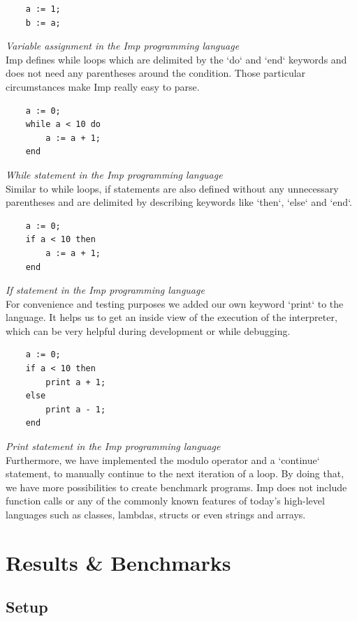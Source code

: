 \documentclass{article}
\begin{document}
\begin{verbatim}
    a := 1;
    b := a;
\end{verbatim}
\textit{Variable assignment in the Imp programming language} \\

Imp defines while loops which are delimited by the `do` and `end` keywords and
does not need any parentheses around the condition. Those particular circumstances
make Imp really easy to parse.

\begin{verbatim}
    a := 0;
    while a < 10 do
        a := a + 1;
    end
\end{verbatim}
\textit{While statement in the Imp programming language} \\

Similar to while loops, if statements are also defined without any unnecessary
parentheses and are delimited by describing keywords like `then`, `else`
and `end`.

\begin{verbatim}
    a := 0;
    if a < 10 then
        a := a + 1;
    end
\end{verbatim}
\textit{If statement in the Imp programming language} \\

For convenience and testing purposes we added our own keyword `print` to the
language. It helps us to get an inside view of the execution of the interpreter,
which can be very helpful during development or while debugging.

\begin{verbatim}
    a := 0;
    if a < 10 then
        print a + 1;
    else
        print a - 1;
    end
\end{verbatim}
\textit{Print statement in the Imp programming language} \\

Furthermore, we have implemented the modulo operator and a `continue`
statement, to manually continue to the next iteration of a loop. By doing that,
we have more possibilities to create benchmark programs. Imp does not include
function calls or any of the commonly known features of today's high-level
languages such as classes, lambdas, structs or even strings and arrays.

\section{Results \& Benchmarks}
\subsection{Setup}
\end{document}
